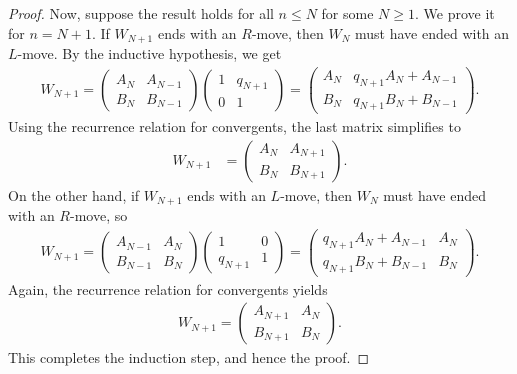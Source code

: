 \documentclass[10pt,a4paper]{amsart}
\begin{document}
\begin{proof}
Now, suppose the result holds for all $ n \leq N $ for some $ N \geq 1 $. We prove it for $ n = N + 1 $. If $ W_{N + 1} $ ends with an $ R $-move, then $ W_N $ must have ended with an $ L $-move. By the inductive hypothesis, we get
\begin{align*}
	W_{N + 1} = \begin{pmatrix} A_N & A_{N - 1} \\ B_N & B_{N - 1} \end{pmatrix} \begin{pmatrix} 1 & q_{N + 1} \\ 0 & 1 \end{pmatrix} = \begin{pmatrix} A_N & q_{N + 1} A_N + A_{N - 1} \\ B_N & q_{N + 1} B_N + B_{N - 1} \end{pmatrix}.
\end{align*}
Using the recurrence relation for convergents, the last matrix simplifies to
\begin{align*}
	W_{N + 1} &= \begin{pmatrix} A_N & A_{N + 1} \\ B_N & B_{N + 1} \end{pmatrix}.
\end{align*}
On the other hand, if $ W_{N + 1} $ ends with an $ L $-move, then $ W_N $ must have ended with an $ R $-move, so 
\begin{align*}
	W_{N + 1} = \begin{pmatrix} A_{N - 1} & A_N \\ B_{N - 1} & B_N \end{pmatrix} \begin{pmatrix} 1 & 0 \\ q_{N + 1} & 1 \end{pmatrix} = \begin{pmatrix} q_{N + 1} A_N + A_{N - 1} & A_N \\ q_{N + 1} B_N + B_{N - 1} & B_N \end{pmatrix}.
\end{align*}
Again, the recurrence relation for convergents yields
\begin{align*}
	W_{N + 1} = \begin{pmatrix} A_{N + 1} & A_N \\ B_{N + 1} & B_N \end{pmatrix}.
\end{align*}
This completes the induction step, and hence the proof. 
\end{proof}
\end{document}
